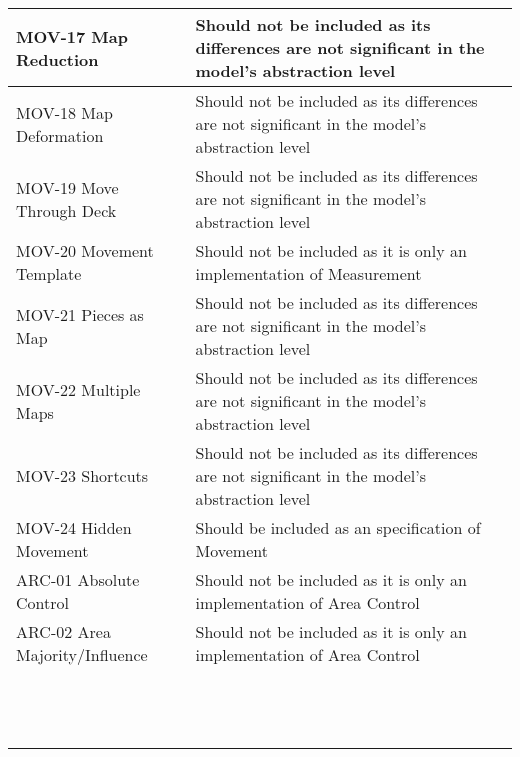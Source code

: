\begin{longtable}{|m{7cm}|m{7cm}|}
        \hline
        MOV-17 Map Reduction & Should not be included as its differences are not significant in the model's abstraction level \\
        \hline
        MOV-18 Map Deformation & Should not be included as its differences are not significant in the model's abstraction level\\
        \hline
        MOV-19 Move Through Deck & Should not be included as its differences are not significant in the model's abstraction level \\
        \hline
        MOV-20 Movement Template & Should not be included as it is only an implementation of Measurement \\
        \hline
        MOV-21 Pieces as Map & Should not be included as its differences are not significant in the model's abstraction level \\
        \hline
        MOV-22 Multiple Maps & Should not be included as its differences are not significant in the model's abstraction level \\
        \hline
        MOV-23 Shortcuts & Should not be included as its differences are not significant in the model's abstraction level \\
        \hline
        MOV-24 Hidden Movement & Should be included as an specification of Movement \\
        \hline
        ARC-01 Absolute Control & Should not be included as it is only an implementation of Area Control \\
        \hline
        ARC-02 Area Majority/Influence & Should not be included as it is only an implementation of Area Control \\
        \hline
         & \\
        \hline
         & \\
        \hline
         & \\
        \hline
         & \\
        \hline
         & \\
        \hline
         & \\
        \hline
         & \\
        \hline
         & \\
        \hline
         & \\
        \hline
         & \\
        \hline
         & \\
        \hline
         & \\
        \hline
         & \\

\end{longtable}
